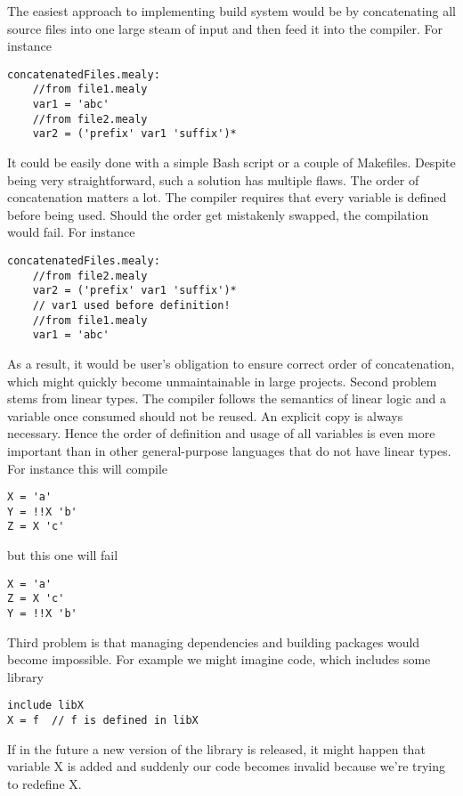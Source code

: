 The easiest approach to implementing build system would be by concatenating all source files into one large steam of input and then feed it into the compiler.
For instance 
\begin{lstlisting}
concatenatedFiles.mealy:
    //from file1.mealy
    var1 = 'abc'
    //from file2.mealy
    var2 = ('prefix' var1 'suffix')*
\end{lstlisting}
It could be easily done with a simple Bash script or a couple of Makefiles. Despite being very straightforward, such a solution has multiple flaws. The order of concatenation matters a lot. The compiler requires that every variable is defined before being used. Should the order get mistakenly swapped, the compilation would fail. For instance 
\begin{lstlisting}
concatenatedFiles.mealy:
    //from file2.mealy
    var2 = ('prefix' var1 'suffix')* 
    // var1 used before definition!
    //from file1.mealy
    var1 = 'abc'
\end{lstlisting}
As a result, it would be user's obligation to ensure correct order of concatenation, which might quickly become unmaintainable in large projects. Second problem stems from linear types. The compiler follows the semantics of linear logic and a variable once consumed should not be reused. An explicit copy is always necessary. Hence the order of definition and usage of all variables is even more important than in other general-purpose languages that do not have linear types. For instance this will compile
\begin{lstlisting}
X = 'a'
Y = !!X 'b'
Z = X 'c'
\end{lstlisting}
but this one will fail
\begin{lstlisting}
X = 'a'
Z = X 'c'
Y = !!X 'b'
\end{lstlisting}
Third problem is that managing dependencies and building packages would become impossible. For example we might imagine code, which includes some library 
\begin{lstlisting}
include libX
X = f  // f is defined in libX
\end{lstlisting}
If in the future a new version of the library is released, it might happen that variable X is added and suddenly our code becomes invalid because we're trying to redefine X.

